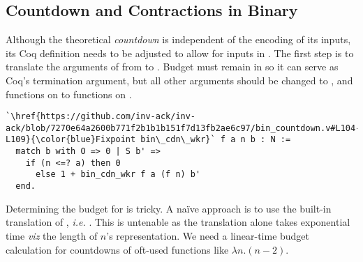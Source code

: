 \subsection{Countdown and Contractions in Binary}

\renewcommand{\Tleb}{\runtime_{\li{N.leb}}}
\renewcommand{\Tsucc}{\runtime_{\li{N.succ}}}

Although the theoretical \emph{countdown} is independent of the encoding
of its inputs, its Coq definition needs to be adjusted to allow for inputs
in . The first step is to translate the arguments of
 from  to . Budget  must
remain in  so it can serve as Coq's termination argument,
but all other  arguments should be changed
to , and functions on  to functions on .
\begin{lstlisting}
`\href{https://github.com/inv-ack/inv-ack/blob/7270e64a2600b771f2b1b1b151f7d13fb2ae6c97/bin_countdown.v#L104-L109}{\color{blue}Fixpoint bin\_cdn\_wkr}` f a n b : N :=
  match b with O => 0 | S b' =>
    if (n <=? a) then 0
      else 1 + bin_cdn_wkr f a (f n) b'
  end.
\end{lstlisting}

Determining the budget for  is tricky.
A naïve approach is to use the built-in  translation of ,
\emph{i.e.} . This is untenable as the translation alone
takes exponential time \emph{viz} the length of $n$'s representation.
We need a linear-time budget calculation for countdowns
of oft-used functions like $\lambda n.(n-2)$.


